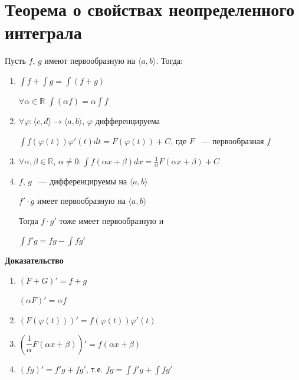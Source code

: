 \documentclass{article}
\begin{document}
				
	\newpage

	\section{Теорема о свойствах неопределенного интеграла}
	
		Пусть $f$, $g$ имеют первообразную на $\langle a, b \rangle$. Тогда:
		
		\begin{enumerate}
		
			\item $\int f + \int g  = \int (f + g)$
			
				$\forall \alpha \in \mathbb{R}$ $\int(\alpha f) = \alpha \int{f}$
				
			\item $\forall \varphi: \langle c, d \rangle \rightarrow \langle a, b \rangle$, $\varphi$ дифференцируема
			
				$\int f(\varphi(t))\varphi'(t)dt = F(\varphi(t)) + C$, где $F$ ~--- первообразная $f$
				
			\item $\forall \alpha, \beta \in \mathbb{R}$, $\alpha \neq 0 : \int f(\alpha x + \beta)dx = \frac{1}{\alpha} F(\alpha x + \beta) + C$
			
			\item $f$, $g$ ~--- дифференцируемы на $\langle a, b \rangle$
			
				$f' \cdot g$ имеет первообразную на $\langle a, b \rangle$
				
				Тогда $f \cdot g'$ тоже имеет первообразную и 
				
				$\int f'g = fg - \int fg'$
				
		\end{enumerate}
			
		\textbf{Доказательство}
		
		\begin{enumerate}
		
			\item $(F + G)' = f + g$
			
				$(\alpha F)' = \alpha f$
				
			\item $(F(\varphi(t)))' = f(\varphi(t))\varphi'(t)$
			
			\item $\left(\dfrac{1}{\alpha} F (\alpha x + \beta)\right)' = f(\alpha x + \beta)$
			
			\item $(fg)' = f'g + fg'$, т.е. $fg = \int f'g + \int fg'$
			
		\end{enumerate}
		
\end{document}

